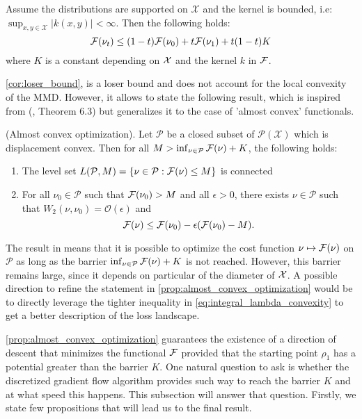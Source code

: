 \begin{corollary}
	\label{cor:loser_bound}Assume the distributions are supported on
	$\mathcal{X}$ and the kernel is bounded, i.e: $\sup_{x,y\in\mathcal{X}}\vert k(x,y)\vert<\infty$.
	Then the following holds:
	\begin{equation}
	{{\mathcal F}}(\nu_{t})\leq(1-t){{\mathcal F}}(\nu_{0})+t{{\mathcal F}}(\nu_{1})+t(1-t)K
	\end{equation}
	where $K$ is a constant depending on ${{\mathcal X}}$ and the kernel $k$ in ${{\mathcal F}}$.
\end{corollary}
%
%
\cref{cor:loser_bound}, is a loser bound and does not account for the local
convexity of the MMD. However, it allows to state the following result,
which is inspired from (\cite{Bottou:2017}, Theorem 6.3) but generalizes
it to the case of 'almost convex' functionals.
\begin{proposition}
	\label{prop:almost_convex_optimization}
	(Almost convex optimization). Let $\mathcal{P}$ be a closed subset
	of $\mathcal{P}(\mathcal{X})$ which is displacement convex. Then
	for all $M>\inf_{\nu\in\mathcal{P}}{{\mathcal F}}(\nu)+K$, the following
	holds:
\end{proposition}
\begin{enumerate}
	\item The level set $L(\mathcal{P},M)=\{\nu\in\mathcal{P}:{{\mathcal F}}(\nu)\leq M\}$
	is connected
	\item For all $\nu_{0}\in\mathcal{P}$ such that ${{\mathcal F}}(\nu_0)>M$
	and all $\epsilon>0$, there exists $\nu\in\mathcal{P}$ such that
	$W_{2}(\nu,\nu_{0})=\mathcal{O}(\epsilon)$ and
	\[
	{{\mathcal F}}(\nu)\leq {{\mathcal F}}(\nu_{0})-\epsilon({{\mathcal F}}(\nu_{0})-M).
	\]
\end{enumerate}
%
The result in  means that it is possible to optimize the cost function $\nu\mapsto {{\mathcal F}}(\nu)$
on $\mathcal{P}$ as long as the barrier $\inf_{\nu\in\mathcal{P}}{{\mathcal F}}(\nu)+K$
is not reached. However, this barrier remains large, since it depends on particular of the diameter of ${{\mathcal X}}$. A possible direction to refine the statement in \cref{prop:almost_convex_optimization} would be to directly leverage the tighter inequality in \cref{eq:integral_lambda_convexity} to get a better description of the loss landscape.


\cref{prop:almost_convex_optimization} guarantees the existence of a direction of descent that minimizes the functional ${{\mathcal F}}$ provided that the starting point $\rho_1$ has a potential greater than the barrier $K$.%
One natural question to ask is whether the  discretized gradient flow algorithm provides such way to reach the barrier $K$ and at what speed this happens. This subsection will answer that question. Firstly, we state few propositions that will lead us to the final result.


